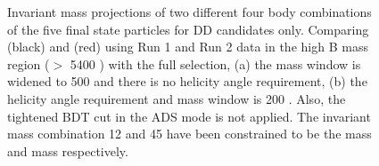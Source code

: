 \begin{figure}
\hfill
{}
\caption{Invariant mass projections of two different four body combinations of the five final state particles for DD candidates only. Comparing \decay{\Dz}{\Km\pip} (black) and \decay{\Dz}{\Kp\pim} (red) using Run 1 and Run 2 data in the high B mass region ($>$ 5400 \mevcc) with the full selection, (a) the \Kstar mass window is widened to 500 \mev and there is no \KS helicity angle requirement, (b) the \KS helicity angle requirement and \Kstar mass window is 200 \mev. Also, the tightened BDT cut in the ADS mode is not applied. The invariant mass combination 12 and 45 have been constrained to be the \Dz mass and \KS mass respectively.}
\label{projection4pions}
\end{figure}


